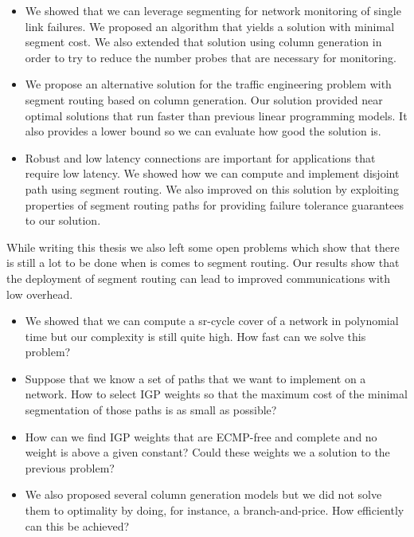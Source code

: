 \documentclass[a4paper,10pt]{book}
\begin{document}
\begin{itemize}
 \item We showed that we can leverage segmenting for network monitoring of single link failures. We proposed an algorithm that yields a
 solution with minimal segment cost. We also extended that solution using column generation in order to try to reduce the number 
 probes that are necessary for monitoring.
 
 \item We propose an alternative solution for the traffic engineering problem with segment routing based on column generation. Our 
 solution provided near optimal solutions that run faster than previous linear programming models. It also provides a lower bound so we can
 evaluate how good the solution is.
 
 \item Robust and low latency connections are important for applications that require low latency. We showed how we can compute and
 implement disjoint path using segment routing. We also improved on this solution by exploiting properties of segment routing paths 
 for providing failure tolerance guarantees to our solution.
\end{itemize}

While writing this thesis we also left some open problems which show that there is still a lot to be done when is comes to
segment routing. Our results show that the deployment of segment routing can lead to improved communications with low 
overhead. 

\begin{itemize}
 \item We showed that we can compute a sr-cycle cover of a network in polynomial time but our complexity is still quite high.
 How fast can we solve this problem?
 
 \item Suppose that we know a set of paths that we want to implement on a network. How to select IGP weights so that the maximum
 cost of the minimal segmentation of those paths is as small as possible?
 
 \item How can we find IGP weights that are ECMP-free and complete and no weight is above a given constant? Could these weights
 we a solution to the previous problem?
 
 \item We also proposed several column generation models but we did not solve them to optimality by doing, for instance,
 a branch-and-price. How efficiently can this be achieved?
 
\end{itemize}

 

\end{document}
